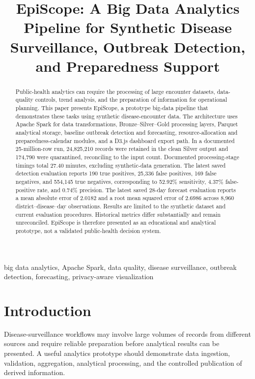 \documentclass[conference]{IEEEtran}
\title{EpiScope: A Big Data Analytics Pipeline for Synthetic Disease Surveillance, Outbreak Detection, and Preparedness Support}
\author{
\IEEEauthorblockN{Md. Samin Osman (0222220005101042) \\ Robiul Hassan (0222220005101043) \\ Walid Talal (0222220005101045) \\ Md. Mahafujul Alam (0222220005101066)}
\IEEEauthorblockA{
Department of Computer Science and Engineering\\
Premier University, Chattogram, Bangladesh
}
}
\begin{document}
\maketitle

\begin{abstract}
Public-health analytics can require the processing of large encounter datasets, data-quality controls, trend analysis, and the preparation of information for operational planning. This paper presents EpiScope, a prototype big-data pipeline that demonstrates these tasks using synthetic disease-encounter data. The architecture uses Apache Spark for data transformations, Bronze--Silver--Gold processing layers, Parquet analytical storage, baseline outbreak detection and forecasting, resource-allocation and preparedness-calendar modules, and a D3.js dashboard export path. In a documented 25-million-row run, 24,825,210 records were retained in the clean Silver output and 174,790 were quarantined, reconciling to the input count. Documented processing-stage timings total 27.40 minutes, excluding synthetic-data generation. The latest saved detection evaluation reports 190 true positives, 25,336 false positives, 169 false negatives, and 554,145 true negatives, corresponding to 52.92\% sensitivity, 4.37\% false-positive rate, and 0.74\% precision. The latest saved 28-day forecast evaluation reports a mean absolute error of 2.0182 and a root mean squared error of 2.6986 across 8,960 district--disease--day observations. Results are limited to the synthetic dataset and current evaluation procedures. Historical metrics differ substantially and remain unreconciled. EpiScope is therefore presented as an educational and analytical prototype, not a validated public-health decision system.
\end{abstract}

\begin{IEEEkeywords}
big data analytics, Apache Spark, data quality, disease surveillance, outbreak detection, forecasting, privacy-aware visualization
\end{IEEEkeywords}

\section{Introduction}

Disease-surveillance workflows may involve large volumes of records from different sources and require reliable preparation before analytical results can be presented. A useful analytics prototype should demonstrate data ingestion, validation, aggregation, analytical processing, and the controlled publication of derived information.
\end{document}
